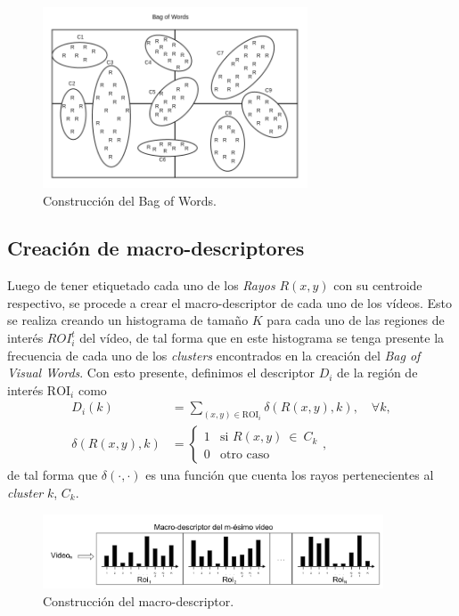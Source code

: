 	\begin{figure}[bt]
		\centering
    		\includegraphics[width=0.7\textwidth]{Figuras/Diagramas/bow_solo.png}
  		\caption{Construcción del Bag of Words.}
  		\label{algoritmo:fig:bow}
	\end{figure}	

	\subsection{Creación de macro-descriptores}
	\label{algoritmo:crea_macro-descriptores}
	Luego de tener etiquetado cada uno de los \textit{Rayos} $R(x,y)$ con su centroide respectivo, se procede a crear el macro-descriptor de cada uno de los vídeos.	 Esto se realiza creando un histograma de tamaño $K$ para cada uno de las regiones de interés ${ROI}_{i}^{t}$ del vídeo, de tal forma que en este histograma se tenga presente la frecuencia de cada uno de los \textit{clusters} encontrados en la creación del \textit{Bag of Visual Words}. Con esto presente, definimos el descriptor $D_i$ de la región de interés $\text{ROI}_i$ como
	\begin{align}
		\label{algoritmo:eq:hist}
		D_i(k) &= \sum_{(x,y)\in \text{ROI}_i} \delta (R(x,y),k), \quad \forall k,\\
		\label{algoritmo:eq:fun_hist}
		 \delta (R(x,y),k) &= \begin{cases}
		 1 & \mbox{si }R(x,y)~\in~C_k\\
     0 & \text{otro caso}
     \end{cases},
	\end{align}
de tal forma que $\delta(\cdot,\cdot)$ es una función que cuenta los rayos pertenecientes al \textit{cluster} $k$, $C_k$.

	\begin{figure}[bt]
		\centering
		\includegraphics[width=0.9\textwidth]{Figuras/Diagramas/macro-descriptor.png}
		\caption{Construcción del macro-descriptor.}
		\label{algoritmo:fig:macrodescriptores}
	\end{figure}	

